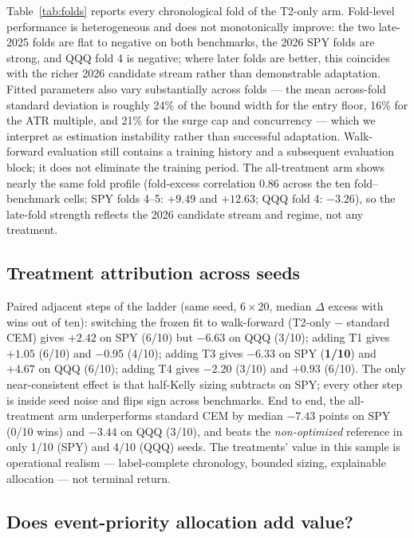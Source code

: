 \documentclass[sigconf,anonymous]{acmart}
\begin{document}
Table~\ref{tab:folds} reports every chronological fold of the T2-only arm. Fold-level performance is heterogeneous and does not monotonically improve: the two late-2025 folds are flat to negative on both benchmarks, the 2026 SPY folds are strong, and QQQ fold 4 is negative; where later folds are better, this coincides with the richer 2026 candidate stream rather than demonstrable adaptation. Fitted parameters also vary substantially across folds --- the mean across-fold standard deviation is roughly 24\% of the bound width for the entry floor, 16\% for the ATR multiple, and 21\% for the surge cap and concurrency --- which we interpret as estimation instability rather than successful adaptation. Walk-forward evaluation still contains a training history and a subsequent evaluation block; it does not eliminate the training period. The all-treatment arm shows nearly the same fold profile (fold-excess correlation $0.86$ across the ten fold--benchmark cells; SPY folds 4--5: $+9.49$ and $+12.63$; QQQ fold 4: $-3.26$), so the late-fold strength reflects the 2026 candidate stream and regime, not any treatment.



\subsection{Treatment attribution across seeds}

Paired adjacent steps of the ladder (same seed, $6\times20$, median $\Delta$ excess with wins out of ten): switching the frozen fit to walk-forward (T2-only $-$ standard CEM) gives $+2.42$ on SPY (6/10) but $\mathbf{-6.63}$ on QQQ (3/10); adding T1 gives $+1.05$ (6/10) and $-0.95$ (4/10); adding T3 gives $\mathbf{-6.33}$ on SPY (\textbf{1/10}) and $+4.67$ on QQQ (6/10); adding T4 gives $-2.20$ (3/10) and $+0.93$ (6/10). The only near-consistent effect is that half-Kelly sizing subtracts on SPY; every other step is inside seed noise and flips sign across benchmarks. End to end, the all-treatment arm underperforms standard CEM by median $-7.43$ points on SPY (0/10 wins) and $-3.44$ on QQQ (3/10), and beats the \emph{non-optimized} reference in only 1/10 (SPY) and 4/10 (QQQ) seeds. The treatments' value in this sample is operational realism --- label-complete chronology, bounded sizing, explainable allocation --- not terminal return.

\subsection{Does event-priority allocation add value?}
\label{sec:t4alloc}
\end{document}
